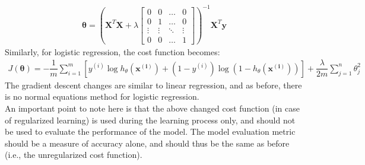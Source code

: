 \documentclass[a4paper, 12pt]{article}
\begin{document}
\begin{align*}
\bm{\theta} = \left(\bm{X}^T\bm{X} + \lambda
\begin{bmatrix}
    0 & 0 & \dots & 0 \\
    0 & 1 & \dots & 0 \\
    \vdots & \vdots & \ddots & \vdots \\
    0 & 0 & \dots & 1
\end{bmatrix}
\right)^{-1}\bm{X}^T\bm{y}
\end{align*}
Similarly, for logistic regression, the cost function becomes:
\begin{align*}
J\left(\bm{\theta}\right) = -\dfrac{1}{m}\sum_{i=1}^{m}\left[y^{\left(i\right)}\log h_{\theta}\left(\bm{x^{\left(i\right)}}\right) + \left(1 - y^{\left(i\right)}\right)\log \left(1 - h_{\theta}\left(\bm{x^{\left(i\right)}}\right)\right)\right] + \dfrac{\lambda}{2m}\sum_{j=1}^{n}\theta_j^2
\end{align*}
The gradient descent changes are similar to linear regression, and as before, there is no normal equations method for logistic regression. \\
\break
An important point to note here is that the above changed cost function (in case of regularized learning) is used during the learning process only, and should not be used to evaluate the performance of the model. The model evaluation metric should be a measure of accuracy alone, and should thus be the same as before (i.e., the unregularized cost function).
\end{document}
